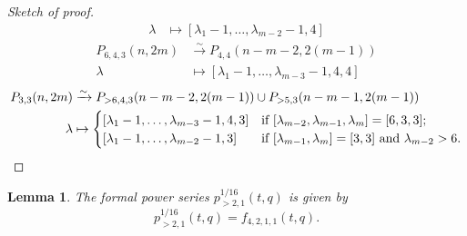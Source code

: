 \documentclass[a4paper, 12pt, reqno]{amsart}
\newtheorem{lemma}[theorem]{Lemma}
\theoremstyle{remark}
\begin{document}
\begin{proof}[Sketch of proof]
\begin{align*}
    \lambda &\mapsto [\lambda_1 - 1, \dots, \lambda_{m - 2} - 1, 4]
  \end{align*}
  \begin{align*}
    P_{6, 4, 3}(n, 2m) &\xrightarrow{\sim} P_{4, 4}(n - m - 2, 2(m - 1)) \\
    \lambda &\mapsto [\lambda_1 - 1, \dots, \lambda_{m - 3} - 1, 4, 4]
  \end{align*}
  \begin{align*}
    P_{3, 3}(n, 2m) &\xrightarrow{\sim} P_{>6, 4, 3}(n - m - 2, 2(m - 1)) \cup P_{>5, 3}(n - m - 1, 2(m - 1)) \\
    \lambda &\mapsto
              \begin{cases}
                [\lambda_1 - 1, \dots, \lambda_{m - 3} - 1, 4, 3] &\text{if }[\lambda_{m - 2}, \lambda_{m - 1}, \lambda_m] = [6, 3, 3]; \\
                [\lambda_1 - 1, \dots, \lambda_{m - 2} - 1, 3] &\text{if }[\lambda_{m - 1}, \lambda_m] = [3, 3]\text{ and }\lambda_{m - 2} > 6. \qedhere
              \end{cases}
  \end{align*}
\end{proof}

\begin{lemma}
  \label{lmm:13}
  The formal power series $p^{1/16}_{>2, 1}(t, q)$ is given by
  \begin{equation*}
    p^{1/16}_{>2, 1}(t, q) = f_{4, 2, 1, 1}(t, q).
  \end{equation*}
\end{lemma}
\end{document}

